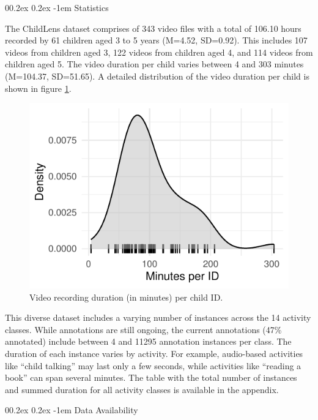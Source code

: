 \documentclass[
  man,floatsintext]{apa6}
\makeatletter
\let\oldparagraph\paragraph
\renewcommand{\paragraph}{
    \@ifstar
      \xxxParagraphStar
      \xxxParagraphNoStar
  }
\newcommand{\xxxParagraphStar}[1]{\oldparagraph*{#1}\mbox{}}
\newcommand{\xxxParagraphNoStar}[1]{\oldparagraph{#1}\mbox{}}
\renewcommand{\paragraph}{\@startsection{paragraph}{4}{\parindent}%
  {0\baselineskip \@plus 0.2ex \@minus 0.2ex}%
  {-1em}%
  {\normalfont\normalsize\bfseries\itshape\typesectitle}}
\makeatother
\begin{document}
\paragraph{Statistics}\label{statistics}

The ChildLens dataset comprises of 343 video files with a total of 106.10 hours recorded by 61 children aged 3 to 5 years (M=4.52, SD=0.92). This includes 107 videos from children aged 3, 122 videos from children aged 4, and 114 videos from children aged 5. The video duration per child varies between 4 and 303 minutes (M=104.37, SD=51.65). A detailed distribution of the video duration per child is shown in figure \ref{fig:minutes-per-child}.

\begin{figure}
\centering
\includegraphics{ChildLens_paper_files/figure-latex/minutes-per-child-1.pdf}
\caption{\label{fig:minutes-per-child}Video recording duration (in minutes) per child ID.}
\end{figure}

This diverse dataset includes a varying number of instances across the 14 activity classes. While annotations are still ongoing, the current annotations (47\% annotated) include between 4 and 11295 annotation instances per class. The duration of each instance varies by activity. For example, audio-based activities like ``child talking'' may last only a few seconds, while activities like ``reading a book'' can span several minutes. The table with the total number of instances and summed duration for all activity classes is available in the appendix.

\paragraph{Data Availability}\label{data-availability}
\end{document}
